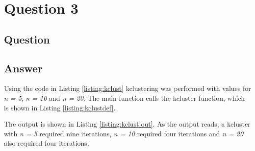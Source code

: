 \section{Question 3}

\subsection{Question}


\subsection{Answer}

Using the code in Listing \ref{listing:kclust} kclustering was performed with values for {\it n = 5}, {\it n = 10} and {\it n = 20}. The main function calls the kcluster function, which is shown in Listing \ref{listing:kclustdef}.





\clearpage

The output is shown in Listing \ref{listing:kclust:out}. As the output reads, a kcluster with {\it n = 5} required nine iterations, {\it n = 10} required four iterations and {\it n = 20} also required four iterations.

